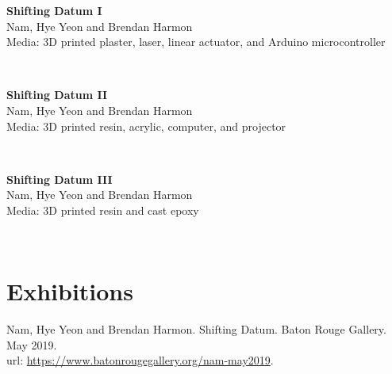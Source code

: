\documentclass[]{baharmon-cv}
\begin{document}
\begin{minipage}[t]{0.85\textwidth}
\textbf{Shifting Datum I}\\
Nam, Hye Yeon and Brendan Harmon\\
Media: 3D printed plaster, laser, linear actuator, and Arduino microcontroller\\
\end{minipage}
\begin{minipage}[t]{0.15\textwidth} 
\end{minipage}\\

\begin{minipage}[t]{0.85\textwidth}
\textbf{Shifting Datum II}\\
Nam, Hye Yeon and Brendan Harmon\\
Media: 3D printed resin, acrylic, computer, and projector\\
\end{minipage}
\begin{minipage}[t]{0.15\textwidth} 
\end{minipage}\\

\begin{minipage}[t]{0.85\textwidth}
\textbf{Shifting Datum III}\\
Nam, Hye Yeon and Brendan Harmon\\
Media: 3D printed resin and cast epoxy\\
\end{minipage}
\begin{minipage}[t]{0.15\textwidth} 
\end{minipage}\\

\sectiondivider \linebreak


\section{Exhibitions} 

Nam, Hye Yeon and Brendan Harmon. Shifting Datum. Baton Rouge Gallery. May 2019.\\
url: \url{https://www.batonrougegallery.org/nam-may2019}.\\

\end{document}
